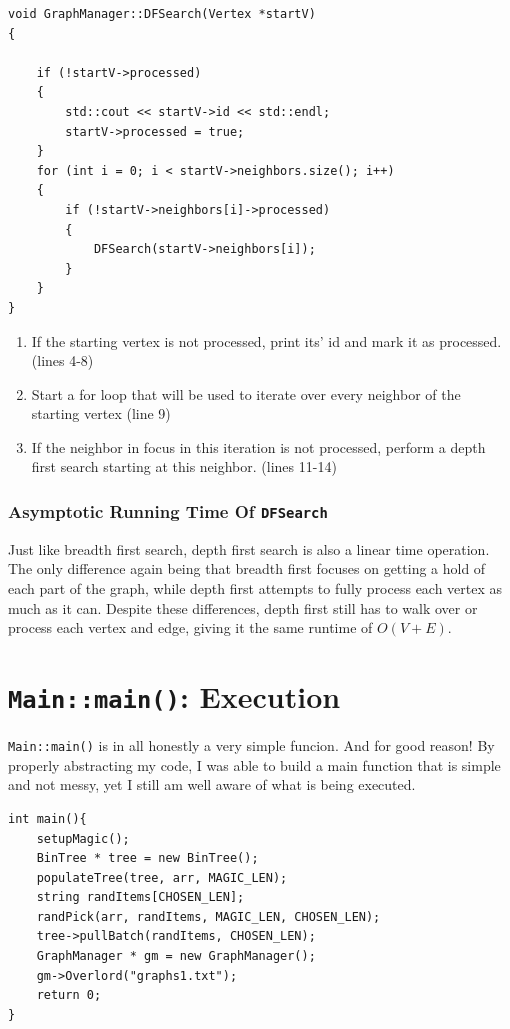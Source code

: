 \documentclass[letterpaper, 10pt]{article}
\begin{document}
\begin{addmargin}[-5em]{1em}
\begin{small}
\begin{verbatim}
void GraphManager::DFSearch(Vertex *startV)
{

	if (!startV->processed)
	{
		std::cout << startV->id << std::endl;
		startV->processed = true;
	}
	for (int i = 0; i < startV->neighbors.size(); i++)
	{
		if (!startV->neighbors[i]->processed)
		{
			DFSearch(startV->neighbors[i]);
		}
	}
}

\end{verbatim}
\end{small}
\end{addmargin}

\begin{enumerate}
    \item If the starting vertex is not processed, print its' id and mark it as processed. (lines 4-8)
    \item Start a for loop that will be used to iterate over every neighbor of the starting vertex (line 9)
    \item If the neighbor in focus in this iteration is not processed, perform a depth first search starting at this neighbor. (lines 11-14)
\end{enumerate}

\subsubsection{Asymptotic Running Time Of \texttt{DFSearch}}

Just like breadth first search, depth first search is also a linear time operation. The only difference again being that breadth first focuses on getting a hold of each part of the graph, while depth first attempts to fully process each vertex as much as it can. Despite these differences, depth first still has to walk over or process each vertex and edge, giving it the same runtime of $O(V+E)$.

\section{\texttt{Main::main()}: Execution}

\texttt{Main::main()} is in all honestly a very simple funcion. And for good reason! By properly abstracting my code, I was able to build a main function that is simple and not messy, yet I still am well aware of what is being executed.
\begin{addmargin}[-5em]{1em}
\begin{small}
\begin{verbatim}
int main(){
	setupMagic();
    BinTree * tree = new BinTree();
    populateTree(tree, arr, MAGIC_LEN);
	string randItems[CHOSEN_LEN];
	randPick(arr, randItems, MAGIC_LEN, CHOSEN_LEN);
	tree->pullBatch(randItems, CHOSEN_LEN);
	GraphManager * gm = new GraphManager();
	gm->Overlord("graphs1.txt");
	return 0;
}
\end{verbatim}
\end{small}
\end{addmargin}
\end{document}
